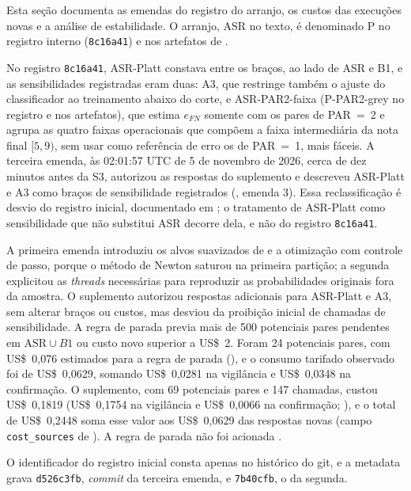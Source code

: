 Esta seção documenta as emendas do registro do arranjo, os custos das execuções novas e a análise de estabilidade. O arranjo, ASR no texto, é denominado P no registro interno (\texttt{8c16a41}) e nos artefatos de .

No registro \texttt{8c16a41}, ASR-Platt constava entre os braços, ao lado de ASR e B1, e as sensibilidades registradas eram duas: A3, que restringe também o ajuste do classificador ao treinamento abaixo do corte, e ASR-PAR2-faixa (P-PAR2-grey no registro e nos artefatos), que estima $e_{FN}$ somente com os pares de PAR~=~2 e agrupa as quatro faixas operacionais que compõem a faixa intermediária da nota final $[5,9)$, sem usar como referência de erro os de PAR~=~1, mais fáceis. A terceira emenda, às 02:01:57 UTC de 5 de novembro de 2026, cerca de dez minutos antes da S3, autorizou as respostas do suplemento e descreveu ASR-Platt e A3 como braços de sensibilidade registrados (, emenda 3). Essa reclassificação é desvio do registro inicial, documentado em ; o tratamento de ASR-Platt como sensibilidade que não substitui ASR decorre dela, e não do registro \texttt{8c16a41}.

A primeira emenda introduziu os alvos suavizados de  e a otimização com controle de passo, porque o método de Newton saturou na primeira partição; a segunda explicitou as \textit{threads} necessárias para reproduzir as probabilidades originais fora da amostra. O suplemento autorizou respostas adicionais para ASR-Platt e A3, sem alterar braços ou custos, mas desviou da proibição inicial de chamadas de sensibilidade. A regra de parada previa mais de 500 potenciais pares pendentes em $\mathrm{ASR}\cup B1$ ou custo novo superior a US\$~2. Foram 24 potenciais pares, com US\$~0,076 estimados para a regra de parada (), e o consumo tarifado observado foi de US\$~0,0629, somando US\$~0,0281 na vigilância e US\$~0,0348 na confirmação. O suplemento, com 69 potenciais pares e 147 chamadas, custou US\$~0,1819 (US\$~0,1754 na vigilância e US\$~0,0066 na confirmação; ), e o total de US\$~0,2448 soma esse valor aos US\$~0,0629 das respostas novas (campo \texttt{cost\_sources} de ). A regra de parada não foi acionada \cite{Jardim2026phdrepo}.

O identificador do registro inicial consta apenas no histórico do git, e a metadata  grava \texttt{d526c3fb}, \textit{commit} da terceira emenda, e \texttt{7b40cfb}, o da segunda.


